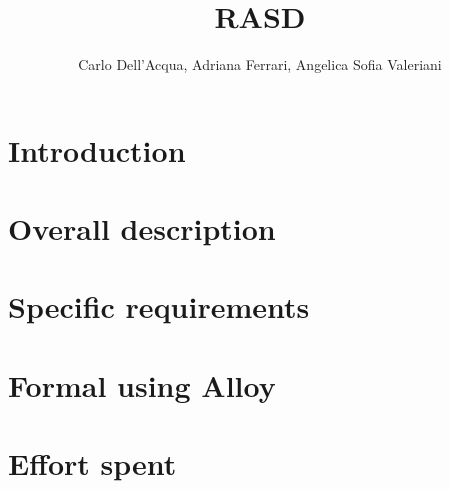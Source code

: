 \documentclass{report}
\title{RASD}
\author{Carlo Dell'Acqua, Adriana Ferrari, Angelica Sofia Valeriani}
\begin{document}
\maketitle
  \tableofcontents

  \chapter{Introduction}
  

  \chapter{Overall description}
  

  \chapter{Specific requirements}
  
  
  \chapter{Formal using Alloy}
  

  \chapter{Effort spent}
  

  \begin{thebibliography}{0}
  \end{thebibliography}
\end{document}
